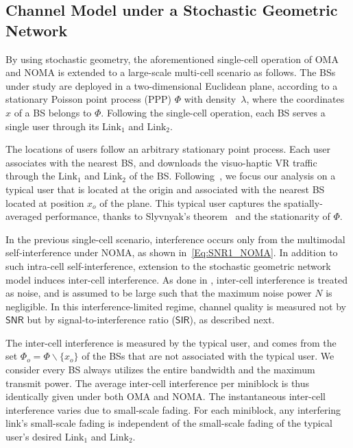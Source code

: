 \documentclass[conference]{IEEEtran}
\def\SNR{\mathsf{SNR}}
\def\SIR{\mathsf{SIR}}
\def\L{\text{Link}}
\begin{document}
\subsection{Channel Model under a Stochastic Geometric Network}
By using stochastic geometry, the aforementioned single-cell operation of OMA and NOMA is extended to a large-scale multi-cell scenario as follows. The BSs under study are deployed in a two-dimensional Euclidean plane, according to a stationary Poisson point process (PPP) $\Phi$ with density~$\lambda$, where the coordinates $x$ of a BS belongs to $\Phi$. Following the single-cell operation, each BS serves a single user through its $\L_1$ and $\L_2$.

The locations of users follow an arbitrary stationary point process. Each user associates with the nearest BS, and downloads the visuo-haptic VR traffic through the $\L_1$ and $\L_2$ of the BS. Following~\cite{Andrews:2011bg}, we focus our analysis on a typical user that is located at the origin and associated with the nearest BS located at position $x_o$ of the plane. This typical user captures the spatially-averaged performance, thanks to Slyvnyak's theorem~\cite{HaenggiSG} and the stationarity of $\Phi$.

In the previous single-cell scenario, interference occurs only from the multimodal self-interference under NOMA, as shown in~\eqref{Eq:SNR1_NOMA}. In addition to such intra-cell self-interference, extension to the stochastic geometric network model induces inter-cell interference. As done in \cite{Andrews:2011bg,JHParkTWC:15,UR2Cspaswin:17}, inter-cell interference is treated as noise, and is assumed to be large such that the maximum noise power $N$ is negligible. In this interference-limited regime, channel quality is measured not by $\SNR$ but by signal-to-interference ratio ($\SIR$), as described next.



The inter-cell interference is measured by the typical user, and comes from the set $\Phi_o=\Phi\backslash\{x_o\}$ of the BSs that are not associated with the typical user. We consider every BS always utilizes the entire bandwidth and the maximum transmit power. The average inter-cell interference per miniblock is thus identically given under both OMA and NOMA. The instantaneous inter-cell interference varies due to small-scale fading. For each miniblock, any interfering link's small-scale fading is independent of the small-scale fading of the typical user's desired $\L_1$ and $\L_2$. 
\end{document}
